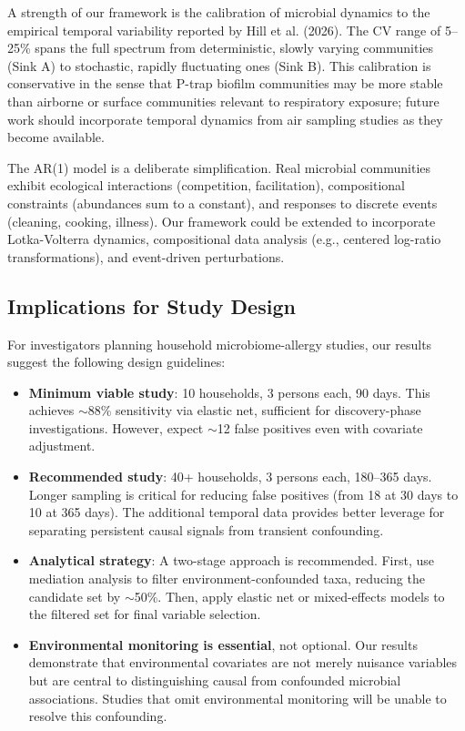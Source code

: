 \documentclass[11pt,letterpaper]{article}
\begin{document}
A strength of our framework is the calibration of microbial dynamics to the empirical temporal variability reported by Hill et al. (2026). The CV range of 5--25\% spans the full spectrum from deterministic, slowly varying communities (Sink A) to stochastic, rapidly fluctuating ones (Sink B). This calibration is conservative in the sense that P-trap biofilm communities may be more stable than airborne or surface communities relevant to respiratory exposure; future work should incorporate temporal dynamics from air sampling studies as they become available.

The AR(1) model is a deliberate simplification. Real microbial communities exhibit ecological interactions (competition, facilitation), compositional constraints (abundances sum to a constant), and responses to discrete events (cleaning, cooking, illness). Our framework could be extended to incorporate Lotka-Volterra dynamics, compositional data analysis (e.g., centered log-ratio transformations), and event-driven perturbations.

\subsection{Implications for Study Design}

For investigators planning household microbiome-allergy studies, our results suggest the following design guidelines:

\begin{itemize}
    \item \textbf{Minimum viable study}: 10 households, 3 persons each, 90 days. This achieves $\sim$88\% sensitivity via elastic net, sufficient for discovery-phase investigations. However, expect $\sim$12 false positives even with covariate adjustment.
    \item \textbf{Recommended study}: 40+ households, 3 persons each, 180--365 days. Longer sampling is critical for reducing false positives (from 18 at 30 days to 10 at 365 days). The additional temporal data provides better leverage for separating persistent causal signals from transient confounding.
    \item \textbf{Analytical strategy}: A two-stage approach is recommended. First, use mediation analysis to filter environment-confounded taxa, reducing the candidate set by $\sim$50\%. Then, apply elastic net or mixed-effects models to the filtered set for final variable selection.
    \item \textbf{Environmental monitoring is essential}, not optional. Our results demonstrate that environmental covariates are not merely nuisance variables but are central to distinguishing causal from confounded microbial associations. Studies that omit environmental monitoring will be unable to resolve this confounding.
\end{itemize}
\end{document}
